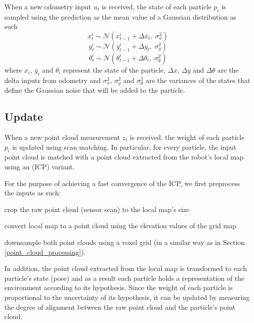 When a new odometry input $u_t$ is received, the state of each particle
$p_i$ is sampled using the prediction as the mean value of a Gaussian
distribution as such
\begin{equation}
    x^i_t \sim \mathcal{N}(x^i_{t-1} + \Delta x_t ,\; \sigma^2_x)
\end{equation}
\begin{equation}
    y^i_t \sim \mathcal{N}(y^i_{t-1} + \Delta y_t ,\; \sigma^2_y)
\end{equation}
\begin{equation}
    \theta^i_t \sim
    \mathcal{N}(\theta^i_{t-1} + \Delta \theta_t ,\; \sigma^2_\theta)
\end{equation}
where
$x_i$, $y_i$ and $\theta_i$ represent the state of the particle,
$\Delta x$, $\Delta y$ and $\Delta \theta$ are the delta inputs from odometry
and $\sigma^2_x$, $\sigma^2_y$ and $\sigma^2_\theta$ are the variances of
the states that define the Gaussian noise that will be added to the particle.

\subsection{Update} \label{pf_update}

When a new point cloud measurement $z_t$ is received, the weight of each
particle $p_i$ is updated using scan matching.
In particular, for every particle, the input point cloud is matched with
a point cloud extracted from the robot's local map using
an  (ICP) variant.

For the purpose of achieving a fast convergence of the ICP,
we first preprocess the inputs as such:
\begin{enumerate*}[label=(\roman*)]
    \item crop the raw point cloud (sensor scan) to the local map's size
    \item convert local map to a point cloud using the elevation values of
        the grid map
    \item downsample both point clouds using a voxel grid (in a similar way
        as in Section \ref{point_cloud_processing}).
\end{enumerate*}

In addition, the point cloud extracted from the local map is transformed to
each particle's state (pose) and as a result each particle holds a
representation of the environment according to its hypothesis.
Since the weight of each particle is proportional to the uncertainty
of its hypothesis, it can be updated by measuring the degree of
alignment between the raw point cloud and the particle's point cloud.

